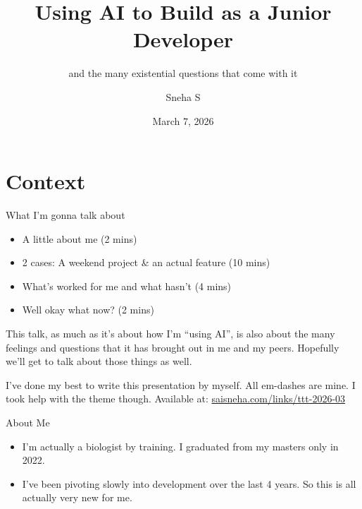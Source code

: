 \documentclass{beamer}
\title[Using AI as a Junior Dev]{Using AI to Build as a Junior Developer}
\subtitle{and the many existential questions that come with it}
\author[Sneha S]{Sneha S}
\date{March 7, 2026}
\begin{document}
\maketitle

\section{Context}

\begin{frame}{What I'm gonna talk about}
    \begin{itemize}
        \item A little about me (2 mins)
        \item 2 cases: A weekend project \& an actual feature (10 mins)
        \item What's worked for me and what hasn't (4 mins)
        \item Well okay what now? (2 mins)
    \end{itemize}

    \pause
    \vspace{1em}
    \footnotesize
    This talk, as much as it's about how I'm ``using AI'', is also about the many feelings and questions that it has brought out in me and my peers. Hopefully we'll get to talk about those things as well.

    \pause
    \vspace{2em}
    \footnotesize
    I've done my best to write this presentation by myself. All em-dashes are mine. I took help with the theme though. Available at: \url{saisneha.com/links/ttt-2026-03}


\end{frame}


\begin{frame}{About Me}

    \begin{itemize}
    \item I'm actually a biologist by training. I graduated from my masters only in 2022.
    \item I've been pivoting slowly into development over the last 4 years. So this is all actually very new for me.
    \end{itemize}

\end{frame}




\end{document}
